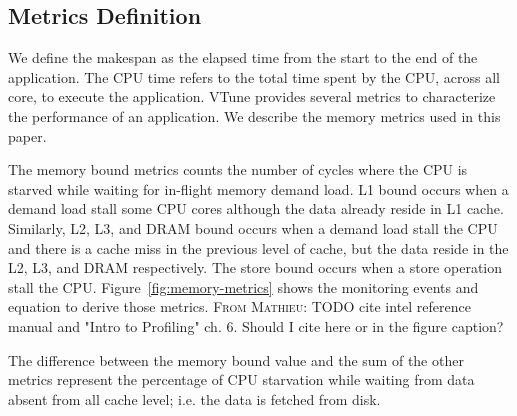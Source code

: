 \documentclass[conference]{IEEEtran}
\newcommand{\MD}[1]{\color{magenta}\textsc{From Mathieu: }#1\color{black}}
\begin{document}
\subsection{Metrics Definition}
We define the makespan as the elapsed time from the start to the end of the application. The CPU time refers to the total time spent by the CPU, across all core, to execute the application. VTune provides several metrics to characterize the performance of an application. We describe the memory metrics used in this paper.

The memory bound metrics counts the number of cycles where the CPU is starved while waiting for in-flight memory demand load. L1 bound occurs when a demand load stall some CPU cores although the data already reside in L1 cache. Similarly, L2, L3, and DRAM bound occurs when a demand load stall the CPU and there is a cache miss in the previous level of cache, but the data reside in the L2, L3, and DRAM respectively. The store bound occurs when a store operation stall the CPU. Figure~\ref{fig:memory-metrics} shows the monitoring events and equation to derive those metrics.
\MD{TODO cite intel reference manual and "Intro to Profiling" ch. 6. Should I cite here or in the figure caption?}

The difference between the memory bound value and the sum of the other metrics represent the percentage of CPU starvation while waiting from data absent from all cache level; i.e. the data is fetched from disk.
\end{document}
